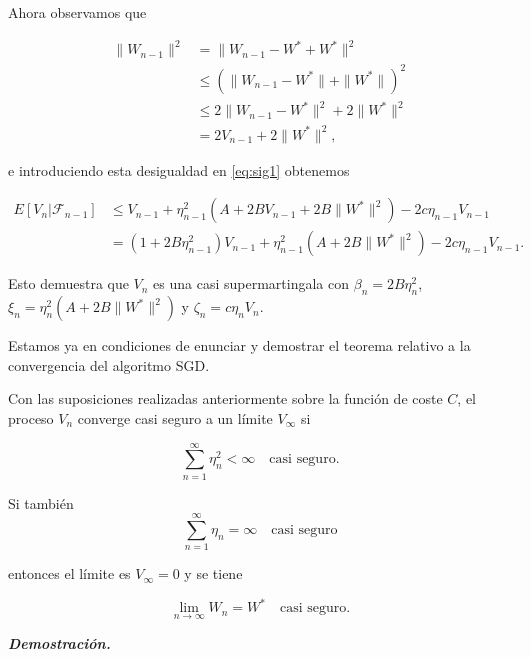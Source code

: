 Ahora observamos que 

\begin{align*}
	\| W_{n-1} \|^2 &= \| W_{n-1} - W^* + W^* \|^2 \\
			     &\leq (\| W_{n-1} - W^* \| + \|W^* \|)^2 \\
			     & \leq 2 \| W_{n-1} - W^* \|^2 + 2 \|W^* \|^2 \\
			     &= 2V_{n-1} + 2 \|W^* \|^2,
\end{align*}

e introduciendo esta desigualdad en \ref{eq:sig1} obtenemos

\begin{align*}
	E[V_n | \mathcal{F}_{n-1} ] &\leq V_{n-1} + \eta^2_{n-1} (A+ 2BV_{n-1} + 2B \|W^* \|^2) - 2c\eta_{n-1} V_{n-1} \\
					&= (1 + 2B \eta_{n-1}^2) V_{n-1} + \eta^2_{n-1} (A + 2B \| W^* \|^2) - 2c \eta_{n-1} V_{n-1}.
\end{align*}

Esto demuestra que $V_n$ es una casi supermartingala con $\beta_n=2B\eta^2_n$, $\xi_n = \eta_n^2(A + 2B \| W^* \|^2)$ y $\zeta_n = c \eta_n V_n$.

Estamos ya en condiciones de enunciar y demostrar el teorema relativo a la convergencia del algoritmo SGD.

\begin{teorema}\label{teor:convsgd}
	Con las suposiciones realizadas anteriormente sobre la función de coste $C$, el proceso $V_n$ converge casi seguro a un límite $V_{\infty}$ si 

	\begin{equation}\label{eq:convsgd1}
		\sum_{n=1}^{\infty} \eta^2_{n} < \infty \quad \text{casi seguro.}
	\end{equation}

	Si también
	\begin{equation}\label{eq:convsgd2}
		\sum_{n=1}^{\infty} \eta_{n} = \infty \quad \text{casi seguro}
	\end{equation}

	entonces el límite es $V_{\infty}=0$ y se tiene

	\begin{equation*}
		\displaystyle \lim_{n \to \infty} W_n = W^* \quad \text{casi seguro.}
	\end{equation*}
\end{teorema}


\begin{flushleft}
   \textbf{\textit{Demostración.}}
\end{flushleft} 

